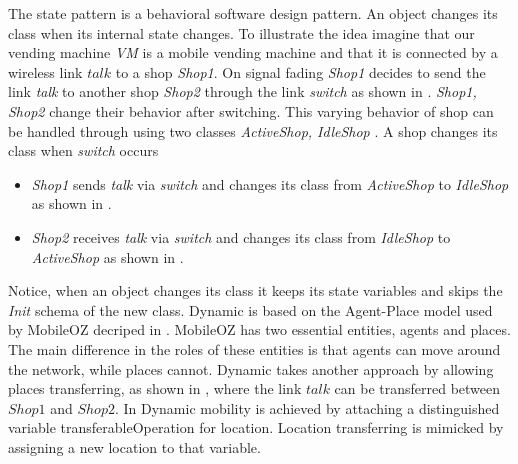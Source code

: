 The state pattern is a behavioral software design pattern. An object changes its class when its internal state changes. To illustrate the idea imagine that our vending machine \textit{VM} is a mobile vending machine and that it is connected by a wireless link $talk$ to a shop \textit{Shop1}. On signal fading \textit{Shop1} decides to send the link \textit{talk} to another shop \textit{Shop2} through the link \textit{switch} as shown in . \textit{Shop1, Shop2} change their behavior after switching. This varying behavior of shop can be handled through using two classes \textit{ActiveShop, IdleShop} . A shop changes its class when \textit{switch} occurs
\begin{itemize}
\item \textit{Shop1} sends \textit{talk} via \textit{switch} and changes its class from \textit{ActiveShop} to \textit{IdleShop} as shown in .
\item \textit{Shop2} receives \textit{talk} via  \textit{switch} and changes its class from \textit{IdleShop} to \textit{ActiveShop} as shown in .
\end{itemize}
Notice, when an object changes its class it keeps its state variables and skips the \textit{Init} schema of the new class.
Dynamic \oz{} is based on the Agent-Place model used by MobileOZ decriped in \cite{Kenji2}. MobileOZ has two
essential entities, agents and places. The main difference in the roles of these entities is that agents can move around the network, while places cannot. Dynamic \oz{} takes another approach by allowing places transferring, as shown in , where the link $talk$ can be transferred between $Shop1$ and $Shop2$. In Dynamic \oz{} mobility is achieved
by attaching a distinguished variable transferableOperation for location. Location transferring
is mimicked by assigning a new location to that variable.


